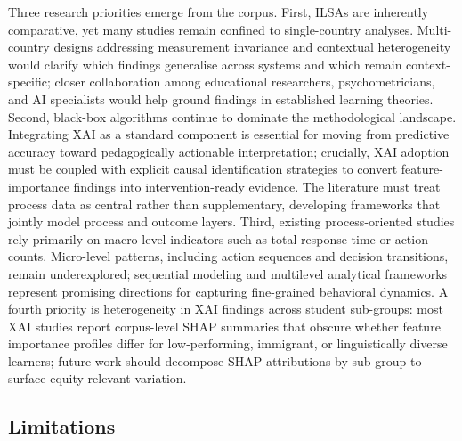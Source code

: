 \documentclass{ieeeaccess}
\begin{document}
Three research priorities emerge from the corpus. First, ILSAs are inherently comparative, yet many studies remain confined to single-country analyses. Multi-country designs addressing measurement invariance and contextual heterogeneity would clarify which findings generalise across systems and which remain context-specific; closer collaboration among educational researchers, psychometricians, and AI specialists would help ground findings in established learning theories. Second, black-box algorithms continue to dominate the methodological landscape. Integrating XAI as a standard component is essential for moving from predictive accuracy toward pedagogically actionable interpretation; crucially, XAI adoption must be coupled with explicit causal identification strategies to convert feature-importance findings into intervention-ready evidence. The literature must treat process data as central rather than supplementary, developing frameworks that jointly model process and outcome layers. Third, existing process-oriented studies rely primarily on macro-level indicators such as total response time or action counts. Micro-level patterns, including action sequences and decision transitions, remain underexplored; sequential modeling and multilevel analytical frameworks represent promising directions for capturing fine-grained behavioral dynamics. A fourth priority is heterogeneity in XAI findings across student sub-groups: most XAI studies report corpus-level SHAP summaries that obscure whether feature importance profiles differ for low-performing, immigrant, or linguistically diverse learners; future work should decompose SHAP attributions by sub-group to surface equity-relevant variation.

\subsection{Limitations}
\label{limitations}
\end{document}

